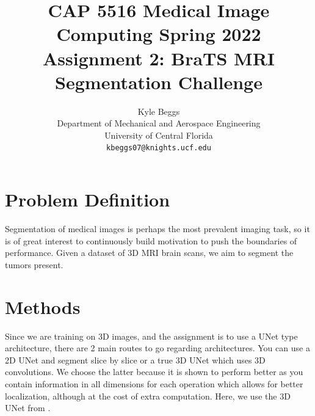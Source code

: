 \documentclass[10pt,twocolumn,letterpaper]{article}
\begin{document}
\title{CAP 5516 Medical Image Computing Spring 2022 Assignment 2: BraTS MRI Segmentation Challenge}

\author{Kyle Beggs\\
Department of Mechanical and Aerospace Engineering\\ 
University of Central Florida\\
{\tt\small kbeggs07@knights.ucf.edu}}

\maketitle
\ificcvfinal\thispagestyle{empty}\fi


\section{Problem Definition}

Segmentation of medical images is perhaps the most prevalent imaging task, so it is of great interest to continuously build motivation to push the boundaries of performance. Given a dataset of 3D MRI brain scans, we aim to segment the tumors present.


\section{Methods}
Since we are training on 3D images, and the assignment is to use a UNet type architecture, there are 2 main routes to go regarding architectures. You can use a 2D UNet and segment slice by slice or a true 3D UNet which uses 3D convolutions. We choose the latter because it is shown to perform better as you contain information in all dimensions for each operation which allows for better localization, although at the cost of extra computation. Here, we use the 3D UNet from \cite{kerfootLeftVentricleQuantificationUsing2019}.
\end{document}
